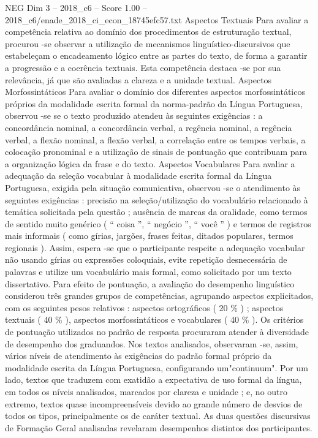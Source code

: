 \begin{textsample}{NEG Dim 3 – 2018\_c6 – Score 1.00 – 2018\_c6/enade\_2018\_ci\_econ\_18745efc57.txt}
Aspectos Textuais Para avaliar a competência relativa ao domínio dos procedimentos de estruturação textual, procurou -se observar a utilização de mecanismos linguístico-discursivos que estabeleçam o encadeamento lógico entre as partes do texto, de forma a garantir a progressão e a coerência textuais.
Esta competência destaca -se por sua relevância, já que são avaliadas a clareza e a unidade textual.
Aspectos Morfossintáticos Para avaliar o domínio dos diferentes aspectos morfossintáticos próprios da modalidade escrita formal da norma-padrão da Língua Portuguesa, observou -se se o texto produzido atendeu às seguintes exigências : a concordância nominal, a concordância verbal, a regência nominal, a regência verbal, a flexão nominal, a flexão verbal, a correlação entre os tempos verbais, a colocação pronominal e a utilização de sinais de pontuação que contribuam para a organização lógica da frase e do texto.
Aspectos Vocabulares Para avaliar a adequação da seleção vocabular à modalidade escrita formal da Língua Portuguesa, exigida pela situação comunicativa, observou -se o atendimento às seguintes exigências : precisão na seleção/utilização do vocabulário relacionado à temática solicitada pela questão ; ausência de marcas da oralidade, como termos de sentido muito genérico ( “ coisa ”, “ negócio ”, “ você ” ) e termos de registros mais informais ( como gírias, jargões, frases feitas, ditados populares, termos regionais ).
Assim, espera -se que o participante respeite a adequação vocabular não usando gírias ou expressões coloquiais, evite repetição desnecessária de palavras e utilize um vocabulário mais formal, como solicitado por um texto dissertativo.
Para efeito de pontuação, a avaliação do desempenho linguístico considerou três grandes grupos de competências, agrupando aspectos explicitados, com os seguintes pesos relativos : aspectos ortográficos ( 20 \% ) ; aspectos textuais ( 40 \% ), aspectos morfossintáticos e vocabulares ( 40 \% ).
Os critérios de pontuação utilizados no padrão de resposta procuraram atender à diversidade de desempenho dos graduandos.
Nos textos analisados, observaram -se, assim, vários níveis de atendimento às exigências do padrão formal próprio da modalidade escrita da Língua Portuguesa, configurando um"continuum".
Por um lado, textos que traduzem com exatidão a expectativa de uso formal da língua, em todos os níveis analisados, marcados por clareza e unidade ; e, no outro extremo, textos quase incompreensíveis devido ao grande número de desvios de todos os tipos, principalmente os de caráter textual.
As duas questões discursivas de Formação Geral analisadas revelaram desempenhos distintos dos participantes.

\end{textsample}

